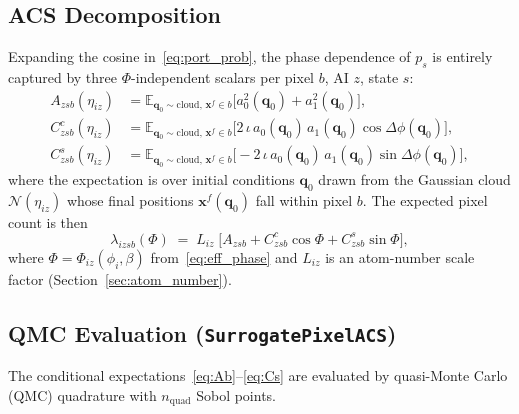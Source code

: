 \documentclass[11pt,a4paper]{article}
\newcommand{\E}{\mathbb{E}}
\newcommand{\N}{\mathcal{N}}
\newcommand{\q}{\mathbf{q}}
\newcommand{\x}{\mathbf{x}}
\begin{document}
\subsection{ACS Decomposition}

Expanding the cosine in~\eqref{eq:port_prob}, the phase dependence of $p_s$ is
entirely captured by three $\Phi$-independent scalars per pixel $b$, AI $z$, state $s$:
\begin{align}
  A_{zsb}(\eta_{iz})
  &= \E_{\q_0 \sim \text{cloud},\, \x^f\in b}
     \!\bigl[a_{0}^2(\q_0) + a_{1}^2(\q_0)\bigr],
  \label{eq:Ab} \\[4pt]
  C_{zsb}^c(\eta_{iz})
  &= \E_{\q_0 \sim \text{cloud},\, \x^f\in b}
     \!\bigl[2\,\iota\,a_{0}(\q_0)\,a_{1}(\q_0)\cos\Delta\phi(\q_0)\bigr],
  \label{eq:Cc} \\[4pt]
  C_{zsb}^s(\eta_{iz})
  &= \E_{\q_0 \sim \text{cloud},\, \x^f\in b}
     \!\bigl[-2\,\iota\,a_{0}(\q_0)\,a_{1}(\q_0)\sin\Delta\phi(\q_0)\bigr],
  \label{eq:Cs}
\end{align}
where the expectation is over initial conditions $\q_0$ drawn from the Gaussian
cloud $\N(\eta_{iz})$ whose final positions $\x^f(\q_0)$ fall within pixel $b$.
The expected pixel count is then
\begin{equation}
  \boxed{
  \lambda_{izsb}(\Phi)
  \;=\;
  L_{iz}\;
  \bigl[A_{zsb} + C_{zsb}^c\cos\Phi + C_{zsb}^s\sin\Phi\bigr],
  }
  \label{eq:lambda_analytic}
\end{equation}
where $\Phi = \Phi_{iz}(\phi_i,\beta)$ from~\eqref{eq:eff_phase} and $L_{iz}$
is an atom-number scale factor (Section~\ref{sec:atom_number}).

\subsection{QMC Evaluation (\texttt{SurrogatePixelACS})}

The conditional expectations~\eqref{eq:Ab}--\eqref{eq:Cs} are evaluated by
quasi-Monte Carlo (QMC) quadrature with $n_\mathrm{quad}$ Sobol points.
\end{document}

